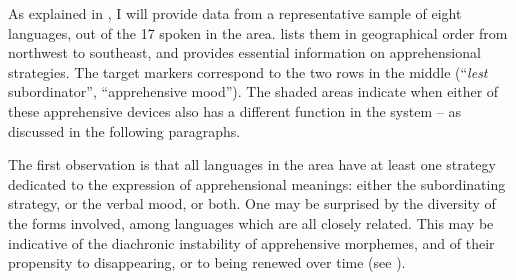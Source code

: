 \documentclass[output=paper,colorlinks,citecolor=brown]{langscibook}
\begin{document}
As explained in , I will provide data from a representative sample of eight languages, out of the 17 spoken in the area.  lists them in geographical order from northwest to southeast, and provides essential information on apprehensional strategies. The target markers correspond to the two rows in the middle (``\textit{lest} subordinator'', ``apprehensive mood''). The shaded areas indicate when either of these apprehensive devices also has a different function in the system -- as discussed in the following paragraphs.

\begin{table}
\caption{A sample of Apprehensional markers from the Torres-Banks area, highlighting their connections with other functions}
\label{tab:apprehensionalmarkers}
\end{table}


The first observation is that all languages in the area have at least one strategy dedicated to the expression of apprehensional meanings: either the subordinating strategy, or the verbal mood, or both. One may be surprised by the diversity of the forms involved, among languages which are all closely related. This may be indicative of the diachronic instability of apprehensive morphemes, and of their propensity to disappearing, or to being renewed over time (see \citealt{chapters/introduction}).
\end{document}
